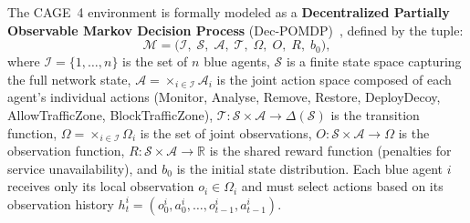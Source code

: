 %
%
%
%


%


The CAGE~4 environment is formally modeled as a
\textbf{Decentralized Partially Observable Markov Decision Process}
(Dec-POMDP)~\cite{arXiv:2410.17351}, defined by the tuple:
\begin{equation}
\label{eq:dec_pomdp}
  \mathcal{M} = \bigl(\mathcal{I},\; \mathcal{S},\; \mathcal{A},\;
  \mathcal{T},\; \Omega,\; O,\; R,\; b_0 \bigr),
\end{equation}
where $\mathcal{I}=\{1,\ldots,n\}$ is the set of $n$ blue agents,
$\mathcal{S}$ is a finite state space capturing the full network state,
$\mathcal{A}=\times_{i\in\mathcal{I}} \mathcal{A}_i$ is the
joint action space composed of each agent's individual actions
(Monitor, Analyse, Remove, Restore, DeployDecoy,
AllowTrafficZone, BlockTrafficZone),
$\mathcal{T}: \mathcal{S}\times\mathcal{A}\to\Delta(\mathcal{S})$
is the transition function,
$\Omega=\times_{i\in\mathcal{I}}\Omega_i$ is the set of
joint observations,
$O:\mathcal{S}\times\mathcal{A}\to\Omega$ is the observation function,
$R:\mathcal{S}\times\mathcal{A}\to\mathbb{R}$ is the shared
reward function (penalties for service unavailability),
and $b_0$ is the initial state distribution.
Each blue agent $i$ receives only its local observation
$o_i\in\Omega_i$ and must select actions based on its observation
history $h_t^i = (o_0^i, a_0^i, \ldots, o_{t-1}^i, a_{t-1}^i)$.


